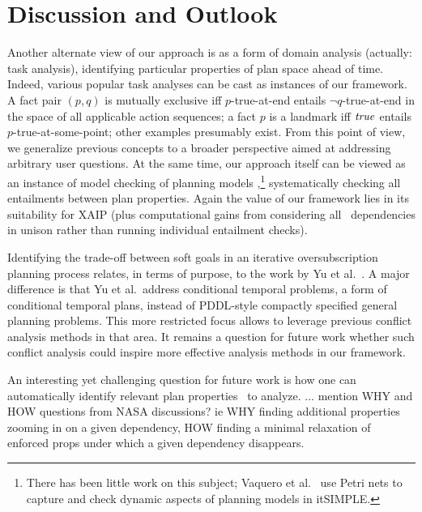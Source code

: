 \section{Discussion and Outlook}
\label{conclusion}


%

Another alternate view of our approach is as a form of domain analysis
(actually: task analysis), identifying particular properties of plan
space ahead of time. Indeed, various popular task analyses can be cast
as instances of our framework. A fact pair $(p,q)$ is mutually
exclusive \cite{blum:furst:ai-97} iff $p$-true-at-end entails $\neg
q$-true-at-end in the space of all applicable action sequences; a fact
$p$ is a landmark \cite{hoffmann:etal:jair-04} iff $\mathit{true}$ entails
$p$-true-at-some-point; other examples presumably exist. From this
point of view, we generalize previous concepts to a broader
perspective aimed at addressing arbitrary user questions. At the same
time, our approach itself can be viewed as an instance of model
checking of planning models \cite{clarke:etal:01},\footnote{There has
  been little work on this subject; Vaquero et
  al.\  use Petri nets to capture and
  check dynamic aspects of planning models in itSIMPLE.}
systematically checking all entailments between plan properties. Again
the value of our framework lies in its suitability for XAIP (plus
computational gains from considering all \props\ dependencies in
unison rather than running individual entailment checks).

Identifying the trade-off between soft goals in an iterative
oversubscription planning process relates, in terms of purpose, to the
work by Yu et al.\ \cite{yu:etal:jair-17}. A major difference is that
Yu et al.\ address conditional temporal problems, a form of
conditional temporal plans, instead of PDDL-style compactly specified
general planning problems. This more restricted focus allows to
leverage previous conflict analysis methods in that area. It remains a
question for future work whether such conflict analysis could inspire
more effective analysis methods in our framework.






An interesting yet challenging question for future work is how one can
automatically identify relevant plan properties \props\ to analyze.
... mention WHY and HOW questions from NASA discussions? ie WHY
finding additional properties zooming in on a given dependency, HOW
finding a minimal relaxation of enforced props under which a given
dependency disappears.
